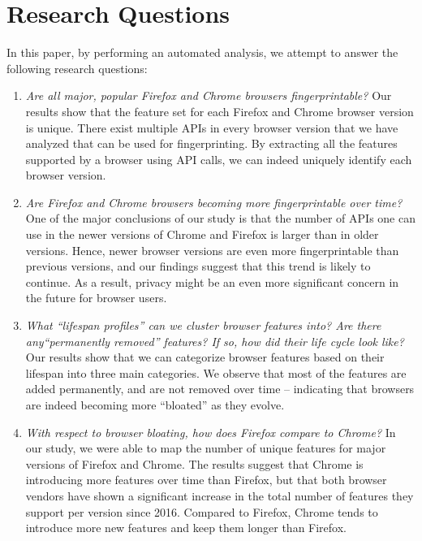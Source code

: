 \section{Research Questions}
\label{sec:introduction}

In this paper, by performing an automated analysis, we attempt to
answer the following research questions:

\begin{enumerate}
  
\item {\em Are all major, popular Firefox and Chrome browsers
    fingerprintable?} Our results show that the feature set for each
  Firefox and Chrome browser version is unique. There exist multiple
  APIs in every browser version that we have analyzed that can be used
  for fingerprinting. By extracting all the features supported by a
  browser using API calls, we can indeed uniquely identify each
  browser version.

\item {\em Are Firefox and Chrome browsers becoming more
    fingerprintable over time?} One of the major conclusions of our
  study is that the number of APIs one can use in the newer versions
  of Chrome and Firefox is larger than in older versions. Hence, newer
  browser versions are even more fingerprintable than previous
  versions, and our findings suggest that this trend is likely to
  continue. As a result, privacy might be an even more significant
  concern in the future for browser users.
    
\item {\em What ``lifespan profiles'' can we cluster browser features
    into? Are there any``permanently removed'' features? If so, how
    did their life cycle look like?} Our results show that we can
  categorize browser features based on their lifespan into three main
  categories. We observe that most of the features are added
  permanently, and are not removed over time -- indicating that
  browsers are indeed becoming more ``bloated'' as they evolve.

\item {\em With respect to browser bloating, how does Firefox compare
    to Chrome?} In our study, we were able to map the number of unique
  features for major versions of Firefox and Chrome. The results
  suggest that Chrome is introducing more features over time than
  Firefox, but that both browser vendors have shown a significant
  increase in the total number of features they support per version
  since 2016. Compared to Firefox, Chrome tends to introduce more new
  features and keep them longer than Firefox.
 

\end{enumerate}
